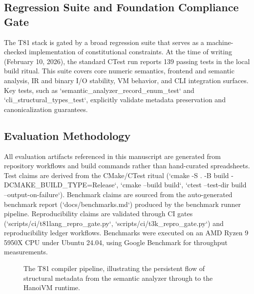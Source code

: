 \documentclass[sigconf, 10pt]{acmart}
\begin{document}
\subsection{Regression Suite and Foundation Compliance Gate}
The T81 stack is gated by a broad regression suite that serves as a machine-checked implementation of constitutional constraints. At the time of writing (February 10, 2026), the standard CTest run reports 139 passing tests in the local build ritual. This suite covers core numeric semantics, frontend and semantic analysis, IR and binary I/O stability, VM behavior, and CLI integration surfaces. Key tests, such as `semantic_analyzer_record_enum_test` and `cli_structural_types_test`, explicitly validate metadata preservation and canonicalization guarantees.
\subsection{Evaluation Methodology}
All evaluation artifacts referenced in this manuscript are generated from repository workflows and build commands rather than hand-curated spreadsheets. Test claims are derived from the CMake/CTest ritual (`cmake -S . -B build -DCMAKE_BUILD_TYPE=Release`, `cmake --build build`, `ctest --test-dir build --output-on-failure`). Benchmark claims are sourced from the auto-generated benchmark report (`docs/benchmarks.md`) produced by the benchmark runner pipeline. Reproducibility claims are validated through CI gates (`scripts/ci/t81lang_repro_gate.py`, `scripts/ci/t3k_repro_gate.py`) and reproducibility ledger workflows. Benchmarks were executed on an AMD Ryzen 9 5950X CPU under Ubuntu 24.04, using Google Benchmark for throughput measurements.
\begin{figure}[h]
\centering
{}
\caption{The T81 compiler pipeline, illustrating the persistent flow of structural metadata from the semantic analyzer through to the HanoiVM runtime.}
\label{fig:pipeline}
\end{figure}
\end{document}

